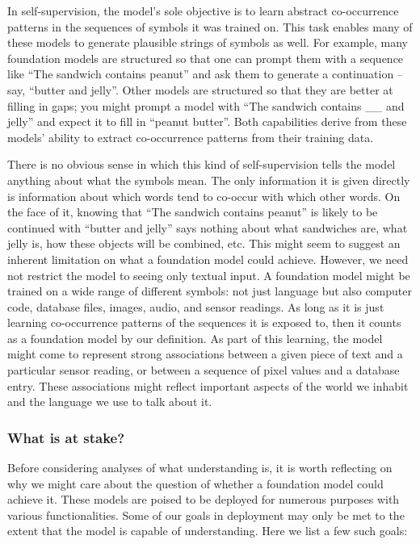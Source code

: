 In self-supervision, the model’s sole objective is to learn abstract co-occurrence patterns in the sequences of symbols it was trained on. This task enables many of these models to generate plausible strings of symbols as well. For example, many foundation models are structured so that one can prompt them with a sequence like ``The sandwich contains peanut'' and ask them to generate a continuation – say, ``butter and jelly''. Other models are structured so that they are better at filling in gaps; you might prompt a model with ``The sandwich contains \_\_ and jelly'' and expect it to fill in ``peanut butter''. Both capabilities derive from these models’ ability to extract co-occurrence patterns from their training data.

There is no obvious sense in which this kind of self-supervision tells the model anything about what the symbols mean. The only information it is given directly is information about which words tend to co-occur with which other words. On the face of it, knowing that ``The sandwich contains peanut'' is likely to be continued with ``butter and jelly'' says nothing about what sandwiches are, what jelly is, how these objects will be combined, etc. This might seem to suggest an inherent limitation on what a foundation model could achieve. However, we need not restrict the model to seeing only textual input. A foundation model might be trained on a wide range of different symbols: not just language but also computer code, database files, images, audio, and sensor readings. As long as it is just learning co-occurrence patterns of the sequences it is exposed to, then it counts as a foundation model by our definition. As part of this learning, the model might come to represent strong associations between a given piece of text and a particular sensor reading, or between a sequence of pixel values and a database entry. These associations might reflect important aspects of the world we inhabit and the language we use to talk about it.

\subsubsection{What is at stake?}

Before considering analyses of what understanding is, it is worth reflecting on why we might care about the question of whether a foundation model could achieve it. These models are poised to be deployed for numerous purposes with various functionalities. Some of our goals in deployment may only be met to the extent that the model is capable of understanding. Here we list a few such goals:

